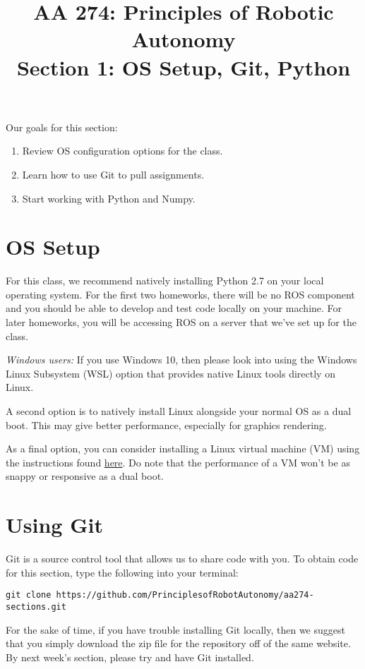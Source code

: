 \documentclass{article}
\title{AA 274: Principles of Robotic Autonomy \\ Section 1: OS Setup, Git, Python}
\date{}
\begin{document}
\maketitle
\pagestyle{fancy}

Our goals for this section: \begin{enumerate}
    \item Review OS configuration options for the class.
    \item Learn how to use Git to pull assignments.
    \item Start working with Python and Numpy.
\end{enumerate}

\section{OS Setup}
For this class, we recommend natively installing Python 2.7 on your local operating system. For the first two homeworks, there will be no ROS component and you should be able to develop and test code locally on your machine. For later homeworks, you will be accessing ROS on a server that we've set up for the class.

\emph{Windows users: }If you use Windows 10, then please look into using the Windows Linux Subsystem (WSL) option that provides native Linux tools directly on Linux. 

A second option is to natively install Linux alongside your normal OS as a dual boot. This may give better performance, especially for graphics rendering. %

As a final option, you can consider installing a Linux virtual machine (VM) using the instructions found  \href{https://docs.google.com/document/d/1ley_pauriyx0PrH8XYfkIrZwXnL3s-xBQvcUY6RE02I/edit#}{here}. Do note that the performance of a VM won't be as snappy or responsive as a dual boot.

\section{Using Git}
Git is a source control tool that allows us to share code with you. To obtain code for this section, type the following into your terminal:

 \begin{lstlisting}[escapechar=|]
 git clone https://github.com/PrinciplesofRobotAutonomy/aa274-sections.git
\end{lstlisting}
For the sake of time, if you have trouble installing Git locally, then we suggest that you simply download the zip file for the repository off of the same website. By next week's section, please try and have Git installed.
\end{document}
